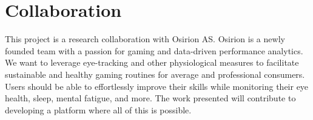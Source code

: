 \section{Collaboration}

This project is a research collaboration with Osirion AS. Osirion is a newly founded team with a passion for gaming and data-driven performance analytics. We want to leverage eye-tracking and other physiological measures to facilitate sustainable and healthy gaming routines for average and professional consumers. Users should be able to effortlessly improve their skills while monitoring their eye health, sleep, mental fatigue, and more. The work presented will contribute to developing a platform where all of this is possible. 